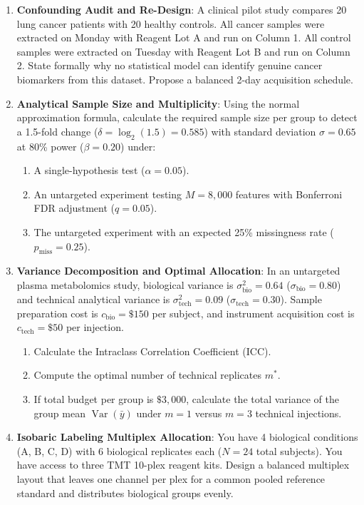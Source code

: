 \documentclass[11pt,twoside,openright]{book}
\begin{document}
\begin{enumerate}
    \item \textbf{Confounding Audit and Re-Design}: A clinical pilot study compares 20 lung cancer patients with 20 healthy controls. All cancer samples were extracted on Monday with Reagent Lot A and run on Column 1. All control samples were extracted on Tuesday with Reagent Lot B and run on Column 2. State formally why no statistical model can identify genuine cancer biomarkers from this dataset. Propose a balanced 2-day acquisition schedule.
    \item \textbf{Analytical Sample Size and Multiplicity}: Using the normal approximation formula, calculate the required sample size per group to detect a 1.5-fold change ($\delta = \log_2(1.5) = 0.585$) with standard deviation $\sigma = 0.65$ at 80\% power ($\beta = 0.20$) under:
    \begin{enumerate}
        \item A single-hypothesis test ($\alpha = 0.05$).
        \item An untargeted experiment testing $M = 8,000$ features with Bonferroni FDR adjustment ($q = 0.05$).
        \item The untargeted experiment with an expected 25\% missingness rate ($p_{\text{miss}} = 0.25$).
    \end{enumerate}
    \item \textbf{Variance Decomposition and Optimal Allocation}: In an untargeted plasma metabolomics study, biological variance is $\sigma^2_{\text{bio}} = 0.64$ ($\sigma_{\text{bio}} = 0.80$) and technical analytical variance is $\sigma^2_{\text{tech}} = 0.09$ ($\sigma_{\text{tech}} = 0.30$). Sample preparation cost is $c_{\text{bio}} = \$150$ per subject, and instrument acquisition cost is $c_{\text{tech}} = \$50$ per injection.
    \begin{enumerate}
        \item Calculate the Intraclass Correlation Coefficient (ICC).
        \item Compute the optimal number of technical replicates $m^*$.
        \item If total budget per group is $\$3,000$, calculate the total variance of the group mean $\operatorname{Var}(\bar{y})$ under $m = 1$ versus $m = 3$ technical injections.
    \end{enumerate}
    \item \textbf{Isobaric Labeling Multiplex Allocation}: You have 4 biological conditions (A, B, C, D) with 6 biological replicates each ($N = 24$ total subjects). You have access to three TMT 10-plex reagent kits. Design a balanced multiplex layout that leaves one channel per plex for a common pooled reference standard and distributes biological groups evenly.
\end{enumerate}
\end{document}
